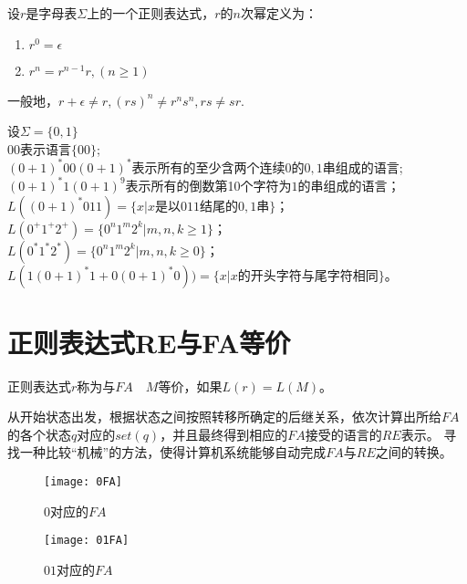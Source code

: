 \begin{definition}
	设$r$是字母表$\Sigma$上的一个正则表达式，$r$的$n$次幂定义为：
	\begin{enumerate}
		\item $r^0=\epsilon$
		\item $r^n=r^{n-1}r,(n\ge 1)$
	\end{enumerate}
\end{definition}

\begin{note}
	一般地，$r+\epsilon\ne r, (rs)^n \ne r^ns^n, rs\ne sr$.
\end{note}

\begin{example} 设$\Sigma = \{0,1\}$\\
	$00$表示语言$\{00\}$;\\
	$(0+1)^\ast 00(0+1)^\ast$表示所有的至少含两个连续$0$的$0,1$串组成的语言;\\
	$(0+1)^\ast 1(0+1)^9$表示所有的倒数第10个字符为$1$的串组成的语言；\\
	$L((0+1)^\ast 011)=\{x|x\text{是以$011$结尾的$0,1
		$串}\}$；\\
	$L(0^+ 1^+ 2^+)=\{0^n 1^m 2^k|m,n,k\ge 1\}$；\\
	$L(0^\ast 1^\ast 2^\ast)=\{0^n 1^m 2^k|m,n,k\ge 0\}$；\\
	$L(1(0+1)^\ast 1+0(0+1)^\ast 0))=\{x|\text{$x$的开头字符与尾字符相同}\}$。
\end{example}

\section{正则表达式RE与FA等价}
\begin{definition}
	正则表达式$r$称为与$FA\quad M$等价，如果$L(r)=L(M)$。
\end{definition}

从开始状态出发，根据状态之间按照转移所确定的后继关系，依次计算出所给$FA$的各个状态$q$对应的$set(q)$，并且最终得到相应的$FA$接受的语言的$RE$表示。 
寻找一种比较“机械”的方法，使得计算机系统能够自动完成$FA$与$RE$之间的转换。 

\begin{figure}[htbp]
	\texttt{[image: 0FA]}
	\caption{$0$对应的$FA$}
	\label{fig:0FA}       %
\end{figure}

\begin{figure}[htbp]
	\texttt{[image: 01FA]}
	\caption{$01$对应的$FA$}
	\label{fig:01FA}       %
\end{figure}

